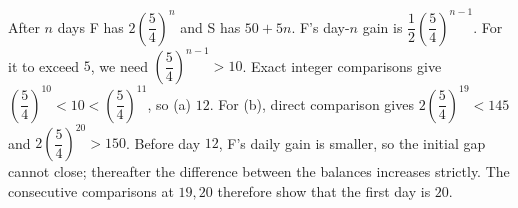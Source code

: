 After $n$ days F has $2(\dfrac{5}{4})^n$ and S has $50+5n$. F's day-$n$ gain is $\dfrac{1}{2}(\dfrac{5}{4})^{n-1}$. For it to exceed $5$, we need $(\dfrac{5}{4})^{n-1}>10$. Exact integer comparisons give $(\dfrac{5}{4})^{10}<10<(\dfrac{5}{4})^{11}$, so (a) $\boxed{12}$.
For (b), direct comparison gives $2(\dfrac{5}{4})^{19}<145$ and $2(\dfrac{5}{4})^{20}>150$. Before day $12$, F's daily gain is smaller, so the initial gap cannot close; thereafter the difference between the balances increases strictly. The consecutive comparisons at $19,20$ therefore show that the first day is $\boxed{20}$.
